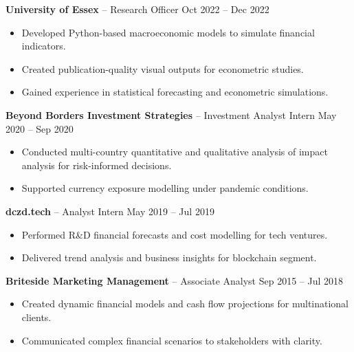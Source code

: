 \documentclass[a4paper,10pt]{article}
\begin{document}
\textbf{University of Essex} -- Research Officer \hfill Oct 2022 -- Dec 2022\\
\begin{itemize}[leftmargin=*]
  \item Developed Python-based macroeconomic models to simulate financial indicators.
  \item Created publication-quality visual outputs for econometric studies.
  \item Gained experience in statistical forecasting and econometric simulations.
\end{itemize}


\textbf{Beyond Borders Investment Strategies} -- Investment Analyst Intern \hfill May 2020 -- Sep 2020\\
\begin{itemize}[leftmargin=*]
  \item Conducted multi-country quantitative and qualitative analysis of impact analysis for risk-informed decisions.
  \item Supported currency exposure modelling under pandemic conditions.
\end{itemize}

\textbf{dczd.tech} -- Analyst Intern \hfill May 2019 -- Jul 2019\\
\begin{itemize}[leftmargin=*]
  \item Performed R\&D financial forecasts and cost modelling for tech ventures.
  \item Delivered trend analysis and business insights for blockchain segment.
\end{itemize}

\textbf{Briteside Marketing Management} -- Associate Analyst \hfill Sep 2015 -- Jul 2018\\
\begin{itemize}[leftmargin=*]
  \item Created dynamic financial models and cash flow projections for multinational clients.
  \item Communicated complex financial scenarios to stakeholders with clarity.
\end{itemize}
\end{document}
